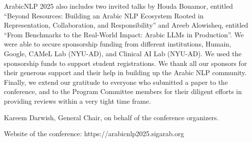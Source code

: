ArabicNLP 2025 also includes two invited talks by Houda Bouamor, entitled “Beyond Resources: Building an Arabic NLP Ecosystem Rooted in Representation, Collaboration, and Responsibility” and Areeb Alowisheq, entitled “From Benchmarks to the Real-World Impact: Arabic LLMs in Production”. We were able to secure sponsorship funding from different institutions, Humain, Google, CAMeL Lab (NYU-AD), and Clinical AI Lab (NYU-AD). We used the sponsorship funds to support student registrations. We thank all our sponsors for their generous support and their help in building up the Arabic NLP community. Finally, we extend our gratitude to everyone who submitted a paper to the conference, and to the Program Committee members for their diligent efforts in providing reviews within a very tight time frame.

Kareem Darwish, General Chair, on behalf of the conference organizers.

Website of the conference: https://arabicnlp2025.sigarab.org